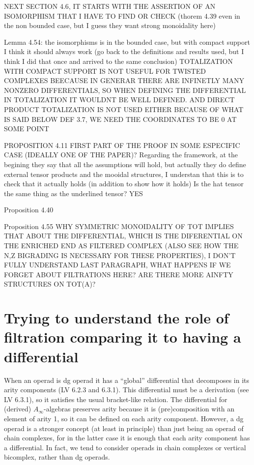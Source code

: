 \documentclass[twoside]{article}
\begin{document}
NEXT SECTION 4.6, IT STARTS WITH THE ASSERTION OF AN ISOMORPHISM THAT I HAVE TO FIND OR CHECK (thorem 4.39 even in the non bounded case, but I guess they want strong monoidality here)

Lemma 4.54: the isomorphisms is in the bounded case, but with compact support I think it should always work (go back to the definitions and results used, but I think I did that once and arrived to the same conclusion) TOTALIZATION WITH COMPACT SUPPORT IS NOT USEFUL FOR TWISTED COMPLEXES BEECAUSE IN GENERAR  THERE ARE INFINETLY MANY NONZERO DIFFERENTIALS, SO WHEN DEFINING THE DIFFERENTIAL IN TOTALIZATION IT WOULDNT BE WELL DEFINED. AND DIRECT PRODUCT TOTALIZATION IS NOT USED EITHER BECAUSE OF WHAT IS SAID BELOW DEF 3.7, WE NEED THE COORDINATES TO BE 0 AT SOME POINT


PROPOSITION 4.11 FIRST PART OF THE PROOF IN SOME ESPECIFIC CASE (IDEALLY ONE OF THE PAPER)?
Regarding the framework, at the begining they say that all the assumptions will hold, but actually they do define external tensor products and the mooidal structures, I understan that this is to check that it actually holds (in addition to show how it holds) Is the hat tensor the same thing as the underlined tensor? YES

Proposition 4.40

Proposition 4.55 WHY SYMMETRIC MONOIDALITY OF TOT IMPLIES THAT ABOUT THE DIFFERENTIAL, WHICH IS THE DIFERENTIAL ON THE ENRICHED END AS FILTERED COMPLEX (ALSO SEE HOW THE N,Z BIGRADING IS NECESSARY FOR THESE PROPERTIES), I DON'T FULLY UNDERSTAND LAST PARAGRAPH, WHAT HAPPENS IF WE FORGET ABOUT FILTRATIONS HERE? ARE THERE MORE AINFTY STRUCTURES ON TOT(A)?


\section*{Trying to understand the role of filtration comparing it to having a differential}

When an operad is dg operad it has a ``global'' differential that decomposes in its arity components (LV 6.2.3 and 6.3.1). This differential must be a derivation (see LV 6.3.1), so it satisfies the usual bracket-like relation. The differential for (derived) $A_\infty$-algebras  preserves arity because it is (pre)composition with an element of arity 1, so it can be defined on each arity component. However, a dg operad is a stronger concept (at least in principle) than just being an operad of chain complexes, for in the latter case it is enough that each arity component has a differential. In fact, we tend to consider operads in chain complexes or vertical bicomplex, rather than dg operads.
\end{document}
